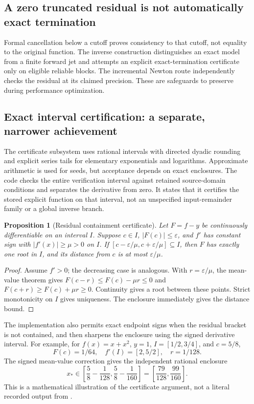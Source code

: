 \documentclass[11pt,letterpaper]{article}
\newcommand{\code}[1]{\texttt{\detokenize{#1}}}
\newtheorem{proposition}{Proposition}[section]
\begin{document}
\subsection{A zero truncated residual is not automatically exact termination}
Formal cancellation below a cutoff proves consistency to that cutoff, not equality to the original function. The inverse construction distinguishes an exact model from a finite forward jet and attempts an explicit exact-termination certificate only on eligible reliable blocks. The incremental Newton route independently checks the residual at its claimed precision. These are safeguards to preserve during performance optimization.\cite{core,incremental}

\subsection{Exact interval certification: a separate, narrower achievement}
The certificate subsystem uses rational intervals with directed dyadic rounding and explicit series tails for elementary exponentials and logarithms. Approximate arithmetic is used for seeds, but acceptance depends on exact enclosures. The code checks the entire verification interval against retained source-domain conditions and separates the derivative from zero. It states that it certifies the stored explicit function on that interval, not an unspecified input-remainder family or a global inverse branch.\cite{certificates}

\begin{proposition}[Residual containment certificate]\label{prop:cert}
Let $F=f-y$ be continuously differentiable on an interval $I$. Suppose $c\in I$, $|F(c)|\le\varepsilon$, and $f'$ has constant sign with $|f'(x)|\ge\mu>0$ on $I$. If $[c-\varepsilon/\mu,c+\varepsilon/\mu]\subseteq I$, then $F$ has exactly one root in $I$, and its distance from $c$ is at most $\varepsilon/\mu$.
\end{proposition}
\begin{proof}
Assume $f'>0$; the decreasing case is analogous. With $r=\varepsilon/\mu$, the mean-value theorem gives $F(c-r)\le F(c)-\mu r\le0$ and $F(c+r)\ge F(c)+\mu r\ge0$. Continuity gives a root between these points. Strict monotonicity on $I$ gives uniqueness. The enclosure immediately gives the distance bound.
\end{proof}
The implementation also permits exact endpoint signs when the residual bracket is not contained, and then sharpens the enclosure using the signed derivative interval. For example, for $f(x)=x+x^2$, $y=1$, $I=[1/2,3/4]$, and $c=5/8$,
\begin{equation}
 F(c)=1/64,\quad f'(I)=[2,5/2],\quad r=1/128.
\end{equation}
The signed mean-value correction gives the independent rational enclosure
\begin{equation}
 x_*\in\left[\frac58-\frac1{128},\frac58-\frac1{160}\right]
      =\left[\frac{79}{128},\frac{99}{160}\right].
\end{equation}
This is a mathematical illustration of the certificate argument, not a literal recorded output from \code{InverseCertificate}.
\end{document}
